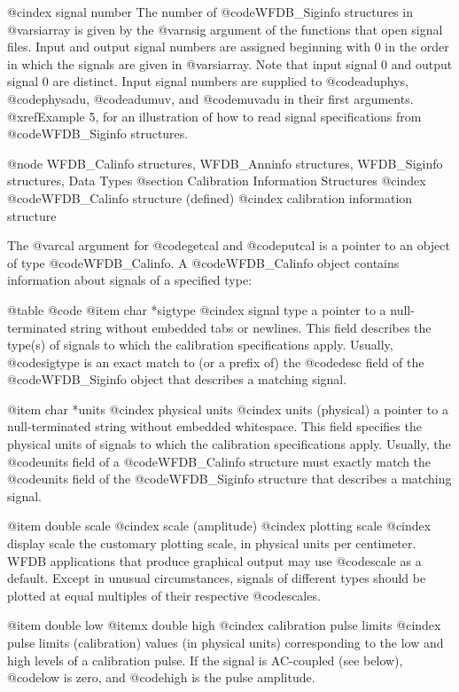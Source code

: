 {{{{{{{{{{@cindex signal number
The number of @code{WFDB_Siginfo} structures in @var{siarray} is given by
the @var{nsig} argument of the functions that open signal files.  Input
and output signal numbers are assigned beginning with 0 in the order in
which the signals are given in @var{siarray}.  Note that input signal 0
and output signal 0 are distinct.  Input signal numbers are supplied to
@code{aduphys}, @code{physadu}, @code{adumuv}, and @code{muvadu} in
their first arguments.  @xref{Example 5}, for an illustration of how to
read signal specifications from @code{WFDB_Siginfo} structures.

@node WFDB_Calinfo structures, WFDB_Anninfo structures, WFDB_Siginfo structures, Data Types
@section Calibration Information Structures
@cindex @code{WFDB_Calinfo} structure (defined)
@cindex calibration information structure

The @var{cal} argument for @code{getcal} and @code{putcal} is a pointer
to an object of type @code{WFDB_Calinfo}.  A @code{WFDB_Calinfo} object
contains information about signals of a specified type:

@table @code
@item char *sigtype
@cindex signal type
a pointer to a null-terminated string without embedded tabs or newlines.
This field describes the type(s) of signals to which the calibration
specifications apply.  Usually, @code{sigtype} is an exact match to
(or a prefix of) the @code{desc} field of the @code{WFDB_Siginfo} object
that describes a matching signal.

@item char *units
@cindex physical units
@cindex units (physical)
a pointer to a null-terminated string without embedded whitespace.
This field specifies the physical units of signals to which the
calibration specifications apply.  Usually, the @code{units} field of
a @code{WFDB_Calinfo} structure must exactly match the @code{units} field of
the @code{WFDB_Siginfo} structure that describes a matching signal.

@item double scale
@cindex scale (amplitude)
@cindex plotting scale
@cindex display scale
the customary plotting scale, in physical units per centimeter.  WFDB
applications that produce graphical output may use @code{scale} as a
default.  Except in unusual circumstances, signals of different types
should be plotted at equal multiples of their respective @code{scale}s.

@item double low
@itemx double high
@cindex calibration pulse limits
@cindex pulse limits (calibration)
values (in physical units) corresponding to the low and high levels of
a calibration pulse.  If the signal is AC-coupled (see below),
@code{low} is zero, and @code{high} is the pulse amplitude.

}}}}}}}}}}
